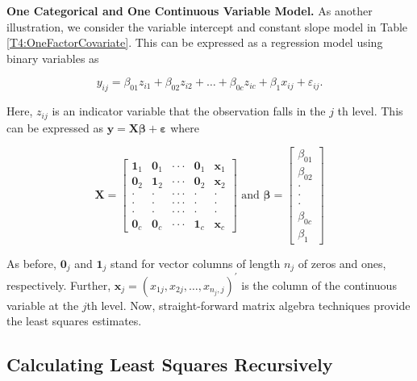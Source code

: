 \textbf{One Categorical and One Continuous Variable Model.} As
another illustration, we consider the variable intercept and
constant slope model in Table \ref{T4:OneFactorCovariate}. This can
be expressed as a regression model using binary variables as

\begin{center}
\[
y_{ij}=\beta_{01}z_{i1}+\beta_{02}z_{i2}+\ldots+\beta
_{0c}z_{ic}+\beta_1x_{ij}+\varepsilon_{ij}.
\]
\end{center}

\noindent Here, $z_{ij}$ is an indicator variable that the observation falls in the $j$%
th level. This can be expressed as $\mathbf{y}=%
\mathbf{X \boldsymbol \beta + \boldsymbol \varepsilon}$ where

\begin{equation}\label{E4:CategoricalContinuous}
\mathbf{X}=%
\begin{bmatrix}
\mathbf{1}_1 & \mathbf{0}_1 & \cdot \cdot \cdot  & \mathbf{0}%
_1 & \mathbf{x}_1 \\
\mathbf{0}_2 & \mathbf{1}_2 & \cdot \cdot \cdot  & \mathbf{0}%
_2 & \mathbf{x}_2 \\
\cdot  & \cdot  & \cdot \cdot \cdot  & \cdot  & \cdot  \\
\cdot  & \cdot  & \cdot \cdot \cdot  & \cdot  & \cdot  \\
\cdot  & \cdot  & \cdot \cdot \cdot  & \cdot  & \cdot  \\
\mathbf{0}_{c} & \mathbf{0}_{c} & \cdot \cdot \cdot  & \mathbf{1}_c & \mathbf{x}_{c}%
\end{bmatrix}%
\text{ \ \ \ \ and \ \ \ }\boldsymbol \beta=
\begin{bmatrix}
\beta_{01} \\
\beta_{02} \\
\cdot  \\
\cdot  \\
\cdot  \\
\beta_{0c} \\
\beta_1%
\end{bmatrix}
\end{equation}

\noindent As before, $\mathbf{0}_j$ and $\mathbf{1}_j$ stand for
vector columns of length $n_j$ of zeros and ones, respectively.
Further, $\mathbf{x}_j=(x_{1j},x_{2j},\ldots,x_{n_j,j})^{\prime}$ is
the column of the continuous variable at the $j$th level. Now,
straight-forward matrix algebra techniques provide the least squares
estimates.

\subsection{Calculating Least Squares Recursively}\label{S4:MatrixSuccess}

